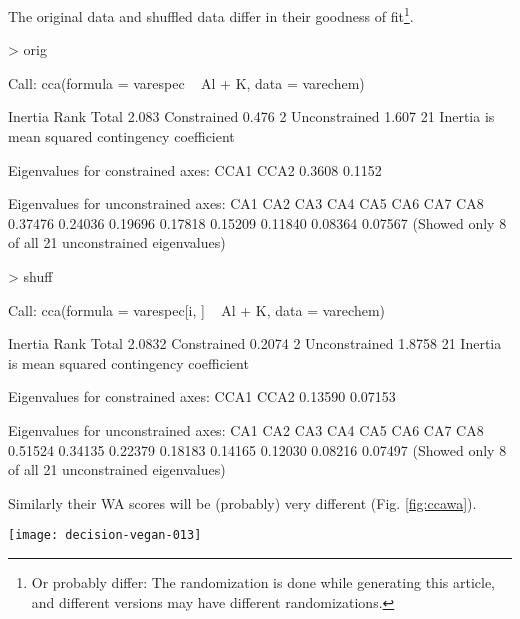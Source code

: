 \documentclass[a4paper,10pt]{amsart}
\begin{document}
The original data and shuffled data differ in their goodness of
fit\footnote{Or probably differ: The randomization is done while
generating this article, and different versions may have different
randomizations.}.
\begin{Schunk}
\begin{Sinput}
> orig
\end{Sinput}
\begin{Soutput}
Call: cca(formula = varespec ~ Al + K, data = varechem)

              Inertia Rank
Total           2.083     
Constrained     0.476    2
Unconstrained   1.607   21
Inertia is mean squared contingency coefficient 

Eigenvalues for constrained axes:
  CCA1   CCA2 
0.3608 0.1152 

Eigenvalues for unconstrained axes:
    CA1     CA2     CA3     CA4     CA5     CA6     CA7     CA8 
0.37476 0.24036 0.19696 0.17818 0.15209 0.11840 0.08364 0.07567 
(Showed only 8 of all 21 unconstrained eigenvalues)
\end{Soutput}
\begin{Sinput}
> shuff
\end{Sinput}
\begin{Soutput}
Call: cca(formula = varespec[i, ] ~ Al + K, data = varechem)

              Inertia Rank
Total          2.0832     
Constrained    0.2074    2
Unconstrained  1.8758   21
Inertia is mean squared contingency coefficient 

Eigenvalues for constrained axes:
   CCA1    CCA2 
0.13590 0.07153 

Eigenvalues for unconstrained axes:
    CA1     CA2     CA3     CA4     CA5     CA6     CA7     CA8 
0.51524 0.34135 0.22379 0.18183 0.14165 0.12030 0.08216 0.07497 
(Showed only 8 of all 21 unconstrained eigenvalues)
\end{Soutput}
\end{Schunk}
Similarly their WA scores will be (probably) very different
(Fig. \ref{fig:ccawa}).
\begin{SCfigure}
\texttt{[image: decision-vegan-013]}
\caption{Procrustes rotation of WA scores of CCA with the original and
  shuffled data.}
\label{fig:ccawa}
\end{SCfigure}
\end{document}
